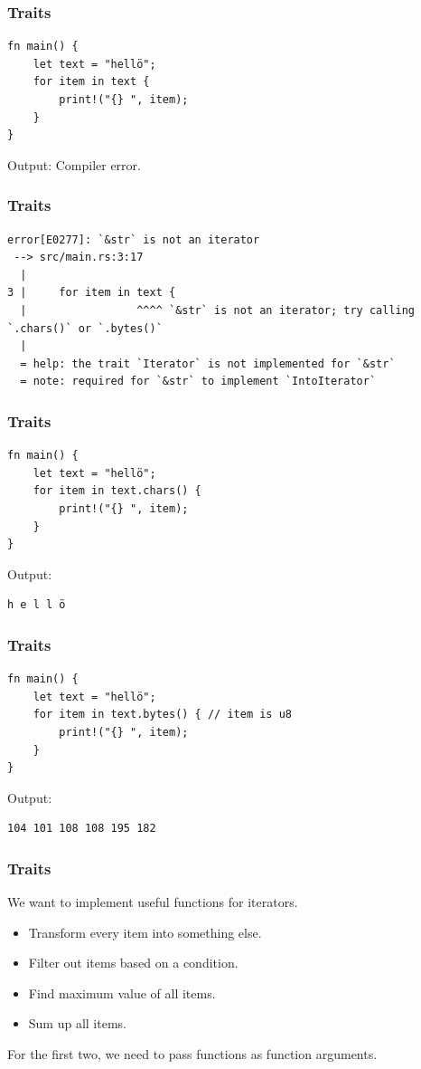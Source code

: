 \begin{frame}[fragile]
    \frametitle{Traits}
    \begin{verbatim}
fn main() {
    let text = "hellö";
    for item in text {
        print!("{} ", item);
    }
}
    \end{verbatim}
    \vfill
    Output:
    \pause
    Compiler error.
\end{frame}

\begin{frame}[fragile]
    \frametitle{Traits}
    \begin{verbatim}
error[E0277]: `&str` is not an iterator
 --> src/main.rs:3:17
  |
3 |     for item in text {
  |                 ^^^^ `&str` is not an iterator; try calling `.chars()` or `.bytes()`
  |
  = help: the trait `Iterator` is not implemented for `&str`
  = note: required for `&str` to implement `IntoIterator`
    \end{verbatim}
\end{frame}

\begin{frame}[fragile]
    \frametitle{Traits}
    \begin{verbatim}
fn main() {
    let text = "hellö";
    for item in text.chars() {
        print!("{} ", item);
    }
}
    \end{verbatim}
    \vfill
    Output:
    \pause
    \begin{verbatim}
h e l l ö 
    \end{verbatim}
\end{frame}

\begin{frame}[fragile]
    \frametitle{Traits}
    \begin{verbatim}
fn main() {
    let text = "hellö";
    for item in text.bytes() { // item is u8
        print!("{} ", item);
    }
}
    \end{verbatim}
    \vfill
    Output:
    \pause
    \begin{verbatim}
104 101 108 108 195 182
    \end{verbatim}
\end{frame}

\begin{frame}[fragile]
    \frametitle{Traits}
    We want to implement useful functions for iterators.
    \vfill
    \begin{itemize}
        \item Transform every item into something else.
        \item Filter out items based on a condition.
        \item Find maximum value of all items.
        \item Sum up all items.
    \end{itemize}
    \pause
    \vfill
    For the first two, we need to pass functions as function arguments.
\end{frame}

